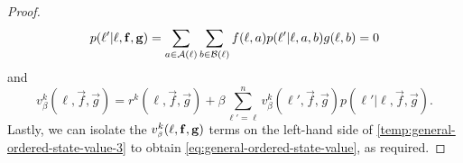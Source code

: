 \begin{proof}
        \begin{equation} \label{temp:general-ordered-state-value-2}
            p(\ell' | \ell, \mathbf{f}, \mathbf{g})
                = \sum_{a \in \mathcal{A}(\ell)} \sum_{b \in \mathcal{B}(\ell)} f(\ell, a) p(\ell' | \ell, a, b) g(\ell, b)
                = 0
        \end{equation}
        and
        \begin{equation} \label{temp:general-ordered-state-value-3}
            v_\beta^k(\ell, \vec{f}, \vec{g})
                = r^k(\ell, \vec{f}, \vec{g}) + \beta \sum_{\ell' = \ell}^n v_\beta^k(\ell', \vec{f}, \vec{g}) p(\ell' | \ell, \vec{f}, \vec{g}).
        \end{equation}
        Lastly, we can isolate the $v^k_\sbeta(\ell, \vec{f}, \vec{g})$ terms on the left-hand side of \eqref{temp:general-ordered-state-value-3} to obtain \eqref{eq:general-ordered-state-value}, as required.
    \end{proof}

